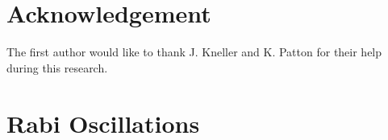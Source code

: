 \documentclass[%
reprint,
 amsmath,amssymb,
 aps,
]{revtex4-1}
\begin{document}
\section{\label{acknowledgement}Acknowledgement}

The first author would like to thank J. Kneller and K. Patton for their help during this research. 









\appendix


\section{\label{sec:rabi-oscillations}Rabi Oscillations}

\end{document}

